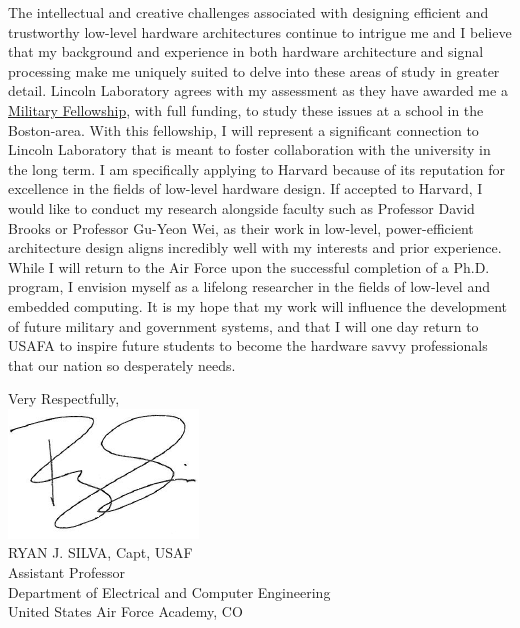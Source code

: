 \documentclass{article}
\begin{document}
The intellectual and creative challenges associated with designing efficient
 and trustworthy low-level hardware architectures continue to intrigue me and I believe that my
background and experience in both hardware architecture and signal processing make
me uniquely suited to delve into these areas of study in greater detail.
Lincoln Laboratory agrees with my assessment as they have awarded me a
\href{http://www.ll.mit.edu/college/fellowsprograms.html}{Military Fellowship},
with full funding, to study these issues at a school in the Boston-area. With
this fellowship, I will represent a significant connection to Lincoln
Laboratory that
is meant to foster collaboration with the university in the long term. I am
specifically applying to Harvard because of its reputation for excellence in
the fields of low-level hardware design. If accepted to Harvard, I would like
to conduct my research alongside faculty such as Professor David Brooks or
Professor Gu-Yeon Wei, as their work in low-level, power-efficient architecture
design aligns incredibly well with my interests and prior experience. While I
will return to the Air Force upon the successful completion of a Ph.D. program,
I envision myself as a lifelong researcher in the fields of low-level and
embedded computing. It is my hope that my work will influence the development
of future military and government systems, and that I will one day return to
USAFA to inspire future students to become the hardware savvy professionals
that our nation so desperately needs.

\vspace{2mm}
\hspace*{2.3in} \noindent Very Respectfully, \\
\hspace*{2.5in} \includegraphics[scale=.5]{silvasig}  \\
\hspace*{2.5in} RYAN J. SILVA, Capt, USAF \\
\hspace*{2.5in} Assistant Professor   \\
\hspace*{2.5in} Department of Electrical and Computer Engineering  \\
\hspace*{2.5in} United States Air Force Academy, CO  
\end{document}
